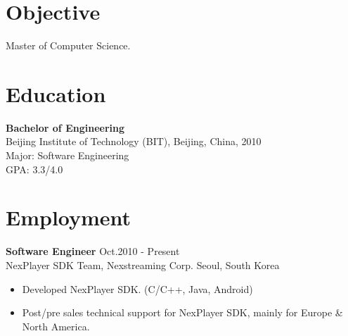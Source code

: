 \documentclass[margin]{res}
\begin{document}

\address{  Email: kimcherwoo@gmail.com\\Mobile: (+82)010-8301-0173 \\Work: (+82)02-2194-5187}
\address{  Nexstreaming Corporation \\  2nd Flr, Gwangseong Bldg, \\ 831-47Yeoksamdong Gangnam-gu \\Seoul, South Korea.\\Postcode: 135-080 }


\begin{resume}
 
\section{Objective}  Master of Computer Science. 

\section{Education} {\bf Bachelor of Engineering  } \\
                Beijing Institute of Technology (BIT), Beijing, China,  2010 	\\
                Major: Software Engineering \\
                GPA: 3.3/4.0
 
\section{Employment} 
				{ \bf Software Engineer  } \hfill Oct.2010 - Present \\                
				NexPlayer SDK Team, Nexstreaming Corp. Seoul, South Korea
                \begin{itemize}  \itemsep -2pt %
                \item   Developed NexPlayer SDK. (C/C++, Java, Android)
				\item   Post/pre sales technical support for NexPlayer SDK, mainly for Europe \& North America.
                \end{itemize}
				

\end{resume}
\end{document}
